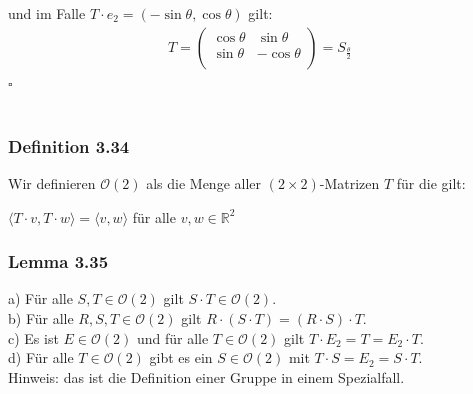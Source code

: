 \documentclass{article}
\begin{document}
und im Falle $T \cdot e_2 = (-\sin \theta, \cos \theta)$ gilt: \\
\begin{align*}
    T = \begin{pmatrix}
        \cos \theta & \sin \theta \\
        \sin \theta & -\cos \theta \\
    \end{pmatrix}
    = S_{\frac{\theta}{2}}
\end{align*}
$\square$ \\
\\
\subsubsection*{Definition 3.34}
Wir definieren $\mathcal{O}(2)$ als die Menge aller $(2 \times 2)$-Matrizen $T$ für die gilt: \\
\begin{center}
    $\langle T \cdot v, T \cdot w \rangle = \langle v,w \rangle$ für alle $v,w \in \mathbb{R}^2$ \\
\end{center}

\subsubsection*{Lemma 3.35}
a) Für alle $S, T \in \mathcal{O}(2)$ gilt $S \cdot T \in \mathcal{O}(2)$. \\
b) Für alle $R, S, T \in \mathcal{O}(2)$ gilt $R \cdot (S \cdot T) = (R \cdot S) \cdot T$. \\
c) Es ist $E \in \mathcal{O}(2)$ und für alle $T \in \mathcal{O}(2)$ gilt $T \cdot E_2 = T = E_2 \cdot T$. \\
d) Für alle $T \in \mathcal{O}(2)$ gibt es ein $S \in \mathcal{O}(2)$ mit $T \cdot S = E_2 = S \cdot T$. \\
Hinweis: das ist die Definition einer Gruppe in einem Spezialfall. \\
\\
\end{document}
